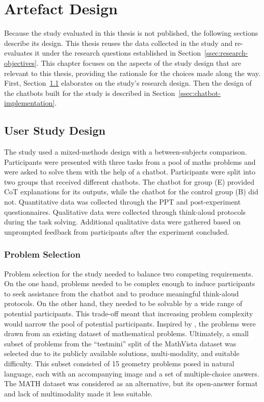 \section{Artefact Design} \label{sec:artefact-design}

Because the study evaluated in this thesis is not published, the following sections describe its design. This thesis reuses the data collected in the study and re-evaluates it under the research questions established in Section~\ref{ssec:research-objectives}. This chapter focuses on the aspects of the study design that are relevant to this thesis, providing the rationale for the choices made along the way. First, Section~\ref{ssec:user-study-design} elaborates on the study's research design. Then the design of the chatbots built for the study is described in Section~\ref{ssec:chatbot-implementation}.

\subsection{User Study Design} \label{ssec:user-study-design}

The study used a mixed-methods design with a between-subjects comparison. Participants were presented with three tasks from a pool of maths problems and were asked to solve them with the help of a chatbot. Participants were split into two groups that received different chatbots. The chatbot for group (E) provided \ac{CoT} explanations for its outputs, while the chatbot for the control group (B) did not. Quantitative data was collected through the \ac{PPT} and post-experiment questionnaires. Qualitative data were collected through think-aloud protocols during the task solving. Additional qualitative data were gathered based on unprompted feedback from participants after the experiment concluded.

\subsubsection{Problem Selection} \label{sssec:problem-selection}

Problem selection for the study needed to balance two competing requirements. On the one hand, problems needed to be complex enough to induce participants to seek assistance from the chatbot and to produce meaningful think-aloud protocols. On the other hand, they needed to be solvable by a wide range of potential participants. This trade-off meant that increasing problem complexity would narrow the pool of potential participants. Inspired by \textcite{Wang2024b}, the problems were drawn from an existing dataset of mathematical problems. Ultimately, a small subset of problems from the \enquote{testmini} split of the MathVista dataset \parencite{MathVista2024} was selected due to its publicly available solutions, multi-modality, and suitable difficulty. This subset consisted of 15 geometry problems posed in natural language, each with an accompanying image and a set of multiple-choice answers. The MATH dataset \parencite{Hendrycks2021} was considered as an alternative, but its open-answer format and lack of multimodality made it less suitable.

